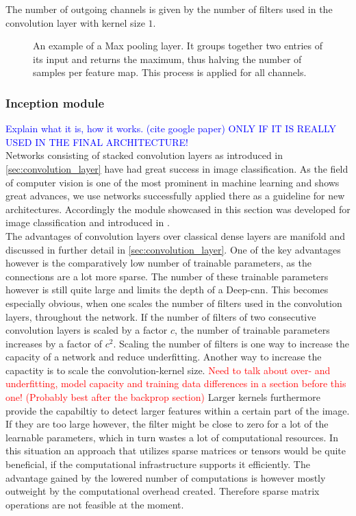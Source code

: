 The number of outgoing channels is given by the number of filters used in the convolution layer with kernel size $1$.
\begin{figure}
\centering

\caption[Max Pooling layer]{An example of a Max pooling layer. It groups together two entries of its input and returns the maximum, thus halving the number of samples per feature map. This process is applied for all channels.}\label{fig:max_pooling}
\end{figure}

\subsubsection{Inception module}\label{sec:inception_module}
\textcolor{blue}{Explain what it is, how it works. (cite google paper) ONLY IF IT IS REALLY USED IN THE FINAL ARCHITECTURE!}\\
Networks consisting of stacked convolution layers as introduced in \autoref{sec:convolution_layer} have had great success in image classification. \cite{deep_learning_book, alex_net, ILSVRC15} As the field of computer vision is one of the most prominent in machine learning and shows great advances, we use networks successfully applied there as a guideline for new architectures. Accordingly the module showcased in this section was developed for image classification and introduced in \cite{inception_module}.\\
The advantages of convolution layers over classical dense layers are manifold and discussed in further detail in \autoref{sec:convolution_layer}. One of the key advantages however is the comparatively low number of trainable parameters, as the connections are a lot more sparse. The number of these trainable parameters however is still quite large and limits the depth of a Deep-\gls{cnn}. This becomes especially obvious, when one scales the number of filters used in the convolution layers, throughout the network. If the number of filters of two consecutive convolution layers is scaled by a factor $c$, the number of trainable parameters increases by a factor of $c^2$. Scaling the number of filters is one way to increase the capacity of a network and reduce underfitting. \cite{inception_module} Another way to increase the capactity is to scale the convolution-kernel size. \textcolor{red}{Need to talk about over- and underfitting, model capacity and training data differences in a section before this one! (Probably best after the backprop section)} Larger kernels furthermore provide the capabiltiy to detect larger features within a certain part of the image. If they are too large however, the filter might be close to zero for a lot of the learnable parameters, which in turn wastes a lot of computational resources. In this situation an approach that utilizes sparse matrices or tensors would be quite beneficial, if the computational infrastructure supports it efficiently. The advantage gained by the lowered number of computations is however mostly outweight by the computational overhead created. Therefore sparse matrix operations are not feasible at the moment. \cite{inception_module}\\

